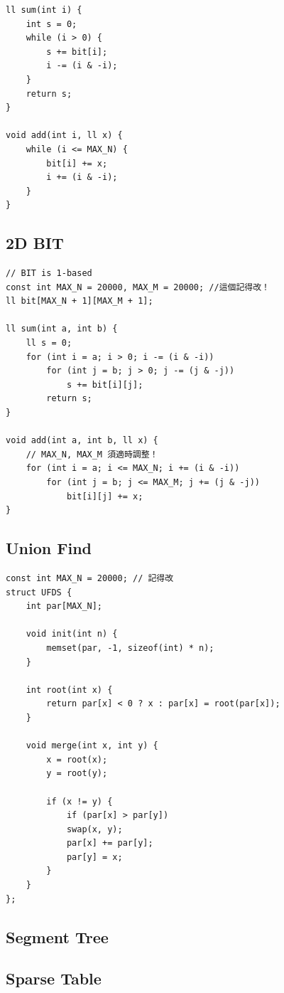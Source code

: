 \documentclass[10pt,oneside]{article}
\begin{document}
\begin{landscape}
\begin{multicols}{2}
\begin{verbatim}
ll sum(int i) {
    int s = 0;
    while (i > 0) {
        s += bit[i];
        i -= (i & -i);
    }
    return s;
}

void add(int i, ll x) {
    while (i <= MAX_N) {
        bit[i] += x;
        i += (i & -i);
    }
}
\end{verbatim}

\subsection{2D BIT}

\begin{verbatim}
// BIT is 1-based
const int MAX_N = 20000, MAX_M = 20000; //這個記得改！
ll bit[MAX_N + 1][MAX_M + 1];

ll sum(int a, int b) {
    ll s = 0;
    for (int i = a; i > 0; i -= (i & -i))
        for (int j = b; j > 0; j -= (j & -j))
            s += bit[i][j];
        return s;
}

void add(int a, int b, ll x) {
    // MAX_N, MAX_M 須適時調整！
    for (int i = a; i <= MAX_N; i += (i & -i))
        for (int j = b; j <= MAX_M; j += (j & -j))
            bit[i][j] += x;
}
\end{verbatim}

\subsection{Union Find}

\begin{verbatim}
const int MAX_N = 20000; // 記得改
struct UFDS {
    int par[MAX_N];
    
    void init(int n) {
        memset(par, -1, sizeof(int) * n);
    }
    
    int root(int x) {
        return par[x] < 0 ? x : par[x] = root(par[x]);
    }
    
    void merge(int x, int y) {
        x = root(x);
        y = root(y);
        
        if (x != y) {
            if (par[x] > par[y])
            swap(x, y);
            par[x] += par[y];
            par[y] = x;
        }
    }
};
\end{verbatim}

\subsection{Segment Tree}

\subsection{Sparse Table}


\end{multicols}
\end{landscape}
\end{document}
